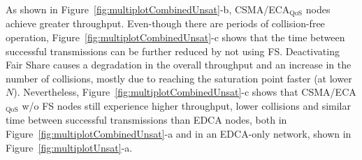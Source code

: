 


As shown in Figure~\ref{fig:multiplotCombinedUnsat}-b, CSMA/ECA$_{\text{QoS}}$ nodes achieve greater throughput. Even-though there are periods of collision-free operation, Figure~\ref{fig:multiplotCombinedUnsat}-c shows that the time between successful transmissions can be further reduced by not using FS. Deactivating Fair Share causes a degradation in the overall throughput and an increase in the number of collisions, mostly due to reaching the saturation point faster (at lower $N$). Nevertheless, Figure~\ref{fig:multiplotCombinedUnsat}-c shows that CSMA/ECA$_{\text{QoS}}$ w/o FS nodes still experience higher throughput, lower collisions and similar time between successful transmissions than EDCA nodes, both in Figure~\ref{fig:multiplotCombinedUnsat}-a and in an EDCA-only network, shown in Figure~\ref{fig:multiplotUnsat}-a.

